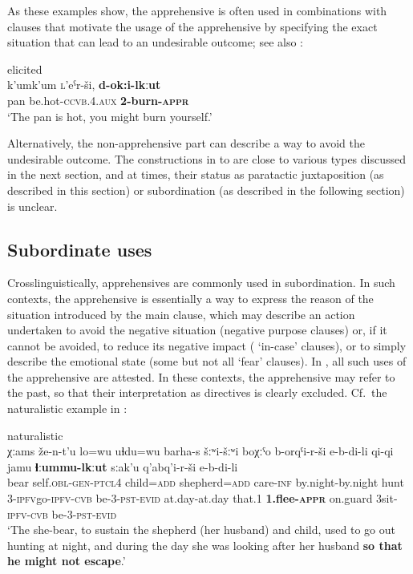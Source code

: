 \documentclass[output=paper,colorlinks,citecolor=brown]{langscibook}
\begin{document}
As these examples show, the apprehensive is often used in combinations with clauses that motivate the usage of the apprehensive by specifying the exact situation that can lead to an undesirable outcome; see also :
 
    \ea \label{ex:DD12} \textnormal{elicited} \\
\gll k'umk'um \textsc{l}'eˁr-ši, \textbf{d-ok:i-lkːut} \\
pan be.hot-\textsc{ccvb.4.aux} \textbf{2-burn-\textsc{appr}} \\
\glt `The pan is hot, you might burn yourself.'
\z


 Alternatively, the non-apprehensive part can describe a way to avoid the undesirable outcome. The constructions in  to  are close to various types discussed in the next section, and at times, their status as paratactic juxtaposition (as described in this section) or subordination (as described in the following section) is unclear.
 

\subsection{Subordinate uses}
\label{subsec:Asubordinate}
 
Crosslinguistically, apprehensives are commonly used in subordination. In such contexts, the apprehensive is essentially a way to express the reason of the situation introduced by the main clause, which may describe an action undertaken to avoid the negative situation (negative purpose clauses) or, if it cannot be avoided, to reduce its negative impact ( `in-case' clauses), or to simply describe the emotional state (some but not all `fear' clauses). In , all such uses of the apprehensive are attested. In these contexts, the apprehensive may refer to the past, so that their interpretation as directives is clearly excluded. Cf.\ the naturalistic example in :

\ea \label{ex:DD13} \textnormal{naturalistic} \\
\gll χːams že-n-t'u lo=wu uɬdu=wu barha-s šːʷi-šːʷi boχːˤo b-o{\textlangle}r{\textrangle}qˤi-r-ši e-b-di-li qi-qi jamu \textbf{ɬːummu-lkːut} sːak'u q'a{\textlangle}b{\textrangle}q'i-r-ši e-b-di-li\\
bear self.\textsc{obl-gen-ptcl4} child=\textsc{add} shepherd=\textsc{add} care-\textsc{inf} by.night-by.night hunt 3-{\textlangle}\textsc{ipfv}{\textrangle}go-\textsc{ipfv-cvb} be-3-\textsc{pst-evid} at.day-at.day that.1 \textbf{1.flee-\textsc{appr}} on.guard {\textlangle}3{\textrangle}sit-\textsc{ipfv-cvb} be-3-\textsc{pst-evid}\\
\glt `The she-bear, to sustain the shepherd (her husband) and child, used to go out hunting at night, and during the day she was looking after her husband \textbf{so that he might not escape}.'
\z
\end{document}

